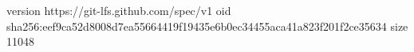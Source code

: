 version https://git-lfs.github.com/spec/v1
oid sha256:eef9ca52d8008d7ea55664419f19435e6b0ec34455aca41a823f201f2ce35634
size 11048
